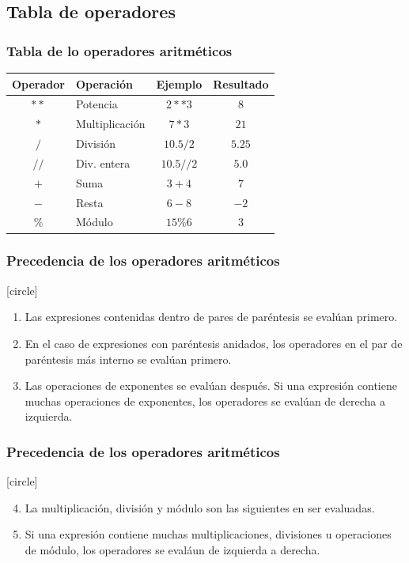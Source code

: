 {\subsection{Tabla de operadores}
\begin{frame}
\frametitle{Tabla de lo operadores aritméticos}
\begin{table}
\fontsize{12}{12}\selectfont
\begin{tabular}{|c | l | c | c|}
\hline
Operador & Operación & Ejemplo & Resultado \\ \hline
$**$ & Potencia & $2**3$ & $8$ \\ \hline
$*$ & Multiplicación & $7*3$ & $21$ \\ \hline
$/$ & División & $10.5/2$ & $5.25$ \\ \hline
$ //$ & Div. entera & $10.5//2 $ & $5.0$ \\ \hline
$+$ & Suma & $3+4$ & $7$ \\ \hline
$-$ & Resta & $6-8$ & $-2$ \\ \hline
$\%$ & Módulo & $15\%6$ & $3$ \\ \hline
\end{tabular}
\end{table}
\end{frame}
\begin{frame}
\frametitle{Precedencia de los operadores aritméticos}
[circle]
\begin{enumerate}[<+->]
\item Las expresiones contenidas dentro de pares de paréntesis se evalúan primero. 
\item En el caso de expresiones con paréntesis anidados, los operadores en el par de paréntesis más interno se evalúan primero.
\item Las operaciones de exponentes se evalúan después. Si una expresión contiene muchas operaciones de exponentes, los operadores se evalúan de derecha a izquierda.
\end{enumerate}
\end{frame}
\begin{frame}
\frametitle{Precedencia de los operadores aritméticos}
[circle]
\begin{enumerate}[<+->]
\setcounter{enumi}{3}
\item La multiplicación, división y módulo son las siguientes en ser evaluadas. 
\item Si una expresión contiene muchas multiplicaciones, divisiones u operaciones de módulo, los operadores se evaláun de izquierda a derecha.

\end{enumerate}
\end{frame}}
